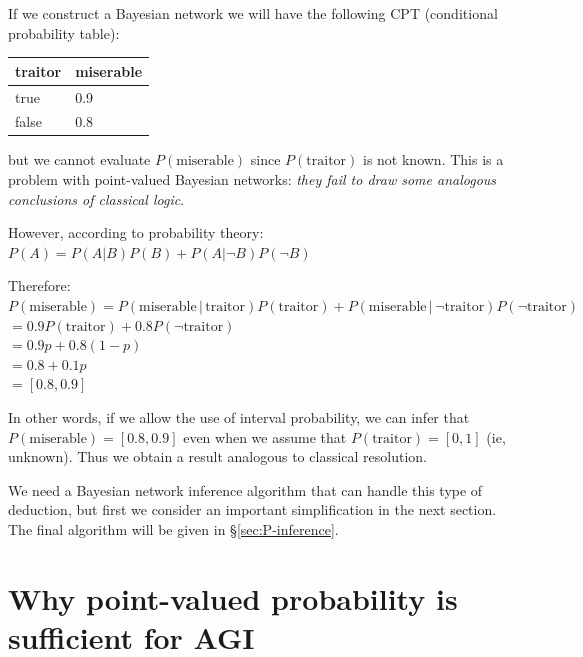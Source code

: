 If we construct a Bayesian network we will have the following CPT (conditional probability table):\\
\hspace*{1cm} \begin{tabular}{|l|l|} \hline
\textbf{traitor} & \textbf{miserable}\\ \hline
true             & 0.9\\
false            & 0.8\\ \hline
\end{tabular}

but we cannot evaluate $P(\mbox{miserable})$ since $P(\mbox{traitor})$ is not known.  This is a problem with point-valued Bayesian networks: \emph{they fail to draw some analogous conclusions of classical logic}.

However, according to probability theory:\\
\hspace*{1cm} $ P(A) = P(A | B) P(B) + P(A | \neg B) P(\neg B) $

Therefore:\\
\hspace*{1cm} $ P(\mbox{miserable}) = P(\mbox{miserable} \,|\, \mbox{traitor}) P(\mbox{traitor}) + P(\mbox{miserable} \,|\, \neg\mbox{traitor}) P(\neg\mbox{traitor}) $\\
\hspace*{1cm} $= 0.9 P(\mbox{traitor}) + 0.8 P(\neg\mbox{traitor}) $\\
\hspace*{1cm} $= 0.9 p + 0.8 (1 - p) $\\
\hspace*{1cm} $= 0.8 + 0.1 p $\\
\hspace*{1cm} $= [0.8, 0.9] $

In other words, if we allow the use of interval probability, we can infer that $P(\mbox{miserable}) = [0.8, 0.9]$ even when we assume that $P(\mbox{traitor}) = [0,1]$ (ie, unknown). Thus we obtain a result analogous to classical resolution.

We need a Bayesian network inference algorithm that can handle this type of deduction, but first we consider an important simplification in the next section.  The final algorithm will be given in \S\ref{sec:P-inference}.

\section{Why point-valued probability is sufficient for AGI}
\label{sec:PointValued}


